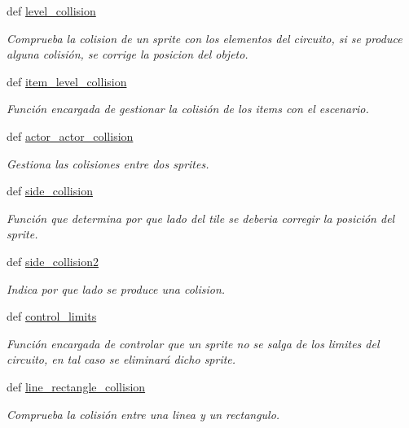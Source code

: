 \begin{DoxyCompactItemize}
def \hyperlink{classengine_1_1collisionmanager_1_1CollisionManager_a8009921b80520f1050fad0f7336a4e2b}{level\-\_\-collision}
\begin{DoxyCompactList}\small\item\em \-Comprueba la colision de un sprite con los elementos del circuito, si se produce alguna colisión, se corrige la posicion del objeto. \end{DoxyCompactList}\item 
def \hyperlink{classengine_1_1collisionmanager_1_1CollisionManager_af845d9594348ba127da1b79bcda93e00}{item\-\_\-level\-\_\-collision}
\begin{DoxyCompactList}\small\item\em \-Función encargada de gestionar la colisión de los items con el escenario. \end{DoxyCompactList}\item 
def \hyperlink{classengine_1_1collisionmanager_1_1CollisionManager_aead70b1db0fd7141684f298f8dc1abeb}{actor\-\_\-actor\-\_\-collision}
\begin{DoxyCompactList}\small\item\em \-Gestiona las colisiones entre dos sprites. \end{DoxyCompactList}\item 
def \hyperlink{classengine_1_1collisionmanager_1_1CollisionManager_a24135efd85895d78c5b4c7c728d61cad}{side\-\_\-collision}
\begin{DoxyCompactList}\small\item\em \-Función que determina por que lado del tile se deberia corregir la posición del sprite. \end{DoxyCompactList}\item 
def \hyperlink{classengine_1_1collisionmanager_1_1CollisionManager_a711945a4bdaae2fa07f3bbf555aac226}{side\-\_\-collision2}
\begin{DoxyCompactList}\small\item\em \-Indica por que lado se produce una colision. \end{DoxyCompactList}\item 
def \hyperlink{classengine_1_1collisionmanager_1_1CollisionManager_a42a2c3df9448d33d9d22a55e07bd3a72}{control\-\_\-limits}
\begin{DoxyCompactList}\small\item\em \-Función encargada de controlar que un sprite no se salga de los limites del circuito, en tal caso se eliminará dicho sprite. \end{DoxyCompactList}\item 
def \hyperlink{classengine_1_1collisionmanager_1_1CollisionManager_a15723cc1c05e3aba112c56a962915cfd}{line\-\_\-rectangle\-\_\-collision}
\begin{DoxyCompactList}\small\item\em \-Comprueba la colisión entre una linea y un rectangulo. \end{DoxyCompactList}\end{DoxyCompactItemize}


